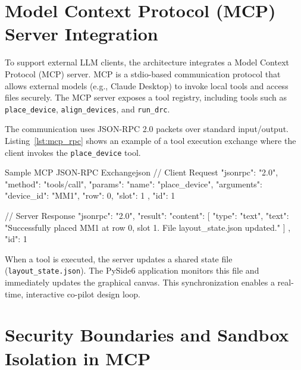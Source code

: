 \newpage
\section[MCP Server Integration]{Model Context Protocol (MCP) Server Integration}
\label{sec:mcp_integration}

To support external LLM clients, the architecture integrates a Model Context Protocol (MCP) server. MCP is a stdio-based communication protocol that allows external models (e.g., Claude Desktop) to invoke local tools and access files securely. The MCP server exposes a tool registry, including tools such as \texttt{place\_device}, \texttt{align\_devices}, and \texttt{run\_drc}.

The communication uses JSON-RPC 2.0 packets over standard input/output. Listing~\ref{lst:mcp_rpc} shows an example of a tool execution exchange where the client invokes the \texttt{place\_device} tool.

\begin{thesiscode}{Sample MCP JSON-RPC Exchange\label{lst:mcp_rpc}}{json}
// Client Request
{
  "jsonrpc": "2.0",
  "method": "tools/call",
  "params": {
    "name": "place_device",
    "arguments": {
      "device_id": "MM1",
      "row": 0,
      "slot": 1
    }
  },
  "id": 1
}

// Server Response
{
  "jsonrpc": "2.0",
  "result": {
    "content": [
      {
        "type": "text",
        "text": "Successfully placed MM1 at row 0, slot 1. File layout_state.json updated."
      }
    ]
  },
  "id": 1
}
\end{thesiscode}

\vspace{0.5cm}
When a tool is executed, the server updates a shared state file (\texttt{layout\_state.json}). The PySide6 application monitors this file and immediately updates the graphical canvas. This synchronization enables a real-time, interactive co-pilot design loop.

\section[Security Boundaries]{Security Boundaries and Sandbox Isolation in MCP}
\label{sec:mcp_security}

